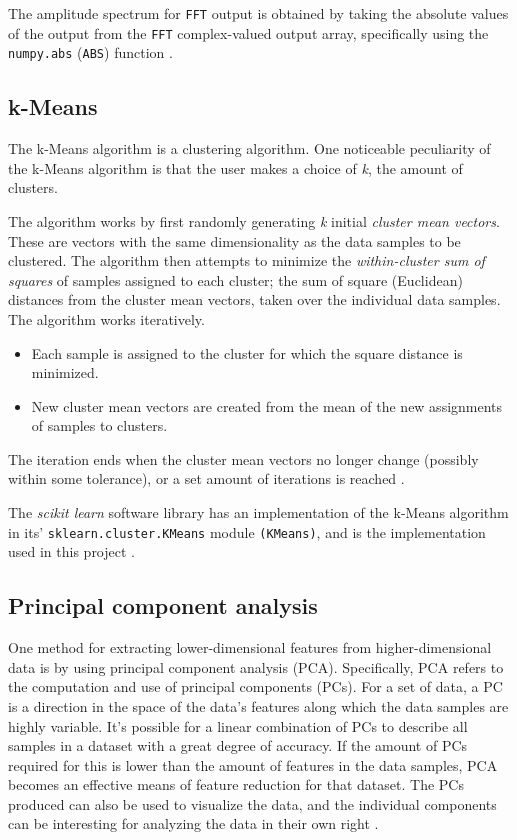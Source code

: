 \documentclass{article}
\begin{document}
The amplitude spectrum for \texttt{FFT} output is obtained by taking the absolute values of the output from the \texttt{FFT} complex-valued output array, specifically using the \texttt{numpy.abs} (\texttt{ABS}) function \citep{numpy}.

\subsection{k-Means}
The k-Means algorithm is a clustering algorithm. 
One noticeable peculiarity of the k-Means algorithm is that the user makes a choice of \textit{k}, the amount of clusters. 

The algorithm works by first randomly generating \textit{k} initial \textit{cluster mean vectors}. 
These are vectors with the same dimensionality as the data samples to be clustered. 
The algorithm then attempts to minimize the \textit{within-cluster sum of squares} of samples assigned to each cluster; the sum of square (Euclidean) distances from the cluster mean vectors, taken over the individual data samples.
The algorithm works iteratively. 
\begin{itemize}
    \item Each sample is assigned to the cluster for which the square distance is minimized.
    \item New cluster mean vectors are created from the mean of the new assignments of samples to clusters.
\end{itemize}
The iteration ends when the cluster mean vectors no longer change (possibly within some tolerance), or a set amount of iterations is reached \citep[p258-260]{PractStats}.

The \textit{scikit learn} software library has an implementation of the k-Means algorithm in its' \texttt{sklearn.cluster.KMeans} module \texttt{(KMeans)}, and is the implementation used in this project \citep{SKLEARN}.

\subsection{Principal component analysis}
One method for extracting lower-dimensional features from higher-dimensional data is by using principal component analysis (PCA).
Specifically, PCA refers to the computation and use of principal components (PCs).
For a set of data, a PC is a direction in the space of the data's features along which the data samples are highly variable.
It's possible for a linear combination of PCs to describe all samples in a dataset with a great degree of accuracy.
If the amount of PCs required for this is lower than the amount of features in the data samples, PCA becomes an effective means of feature reduction for that dataset.
The PCs produced can also be used to visualize the data, and the individual components can be interesting for analyzing the data in their own right \citep[p374-380]{ISLR}.
\end{document}
